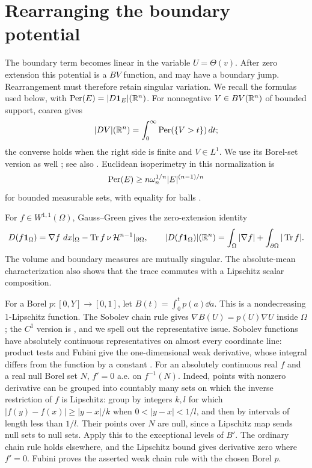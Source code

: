 \section{Rearranging the boundary potential}\label{sec:rearrangement}

The boundary term becomes linear in the variable \(U=\Theta(v)\).
After zero extension this potential is a \(BV\) function, and may have
a boundary jump. Rearrangement must therefore retain singular variation.
We recall the formulas used below, with
\(\operatorname{Per}(E)=|D\mathbf1_E|(\mathbb R^n)\).
For nonnegative \(V\in BV(\mathbb R^n)\) of bounded support, coarea gives
\[
 |DV|(\mathbb R^n)=\int_0^\infty\operatorname{Per}(\{V>t\})\,d t;
\]
the converse holds when the right side is finite and \(V\in L^1\).
We use its Borel-set version as well
\cite[Theorem~1.19]{Gorny}; see also
\cite[Theorem~2.6]{LV}.
Euclidean isoperimetry in this normalization is
\[
 \operatorname{Per}(E)\ge n\omega_n^{1/n}|E|^{(n-1)/n}
\]
for bounded measurable sets, with equality for balls
\cite[Theorem~2.1]{AGNT}.

For \(f\in W^{1,1}(\Omega)\), Gauss--Green gives the zero-extension
identity
\begin{equation}\label{eq:zeroextension}
 D(f\mathbf1_\Omega)=\nabla f\,\,d x|_\Omega-
                     \operatorname{Tr} f\,\nu\,\mathcal H^{n-1}|_{\partial\Omega},
 \qquad
 |D(f\mathbf1_\Omega)|(\mathbb R^n)=\int_\Omega|\nabla f|+
                                          \int_{\partial\Omega}|\operatorname{Tr} f|.
\end{equation}
The volume and boundary measures are mutually singular.
The absolute-mean characterization also shows that the trace commutes
with a Lipschitz scalar composition.

For a Borel \(p:[0,Y]\to[0,1]\), let \(B(t)=\int_0^t p(a)\dd a\).
This is a nondecreasing 1-Lipschitz function. The Sobolev chain rule gives
\(\nabla B(U)=p(U)\nabla U\) inside \(\Omega\); the \(C^1\) version is
\cite[Proposition~3.21(2)]{Hunter}, and we spell out the representative
issue. Sobolev functions have absolutely continuous representatives on
almost every coordinate line: product tests and Fubini give the
one-dimensional weak derivative, whose integral differs from the
function by a constant \cite[Proposition~3.6]{Hunter}.
For an absolutely continuous real \(f\) and a real null Borel set \(N\),
\(f'=0\) a.e. on \(f^{-1}(N)\). Indeed, points with nonzero derivative
can be grouped into countably many sets on which the inverse
restriction of \(f\) is Lipschitz: group by integers \(k,l\) for which
\(|f(y)-f(x)|\ge |y-x|/k\) when \(0<|y-x|<1/l\), and then by intervals
of length less than \(1/l\). Their points over \(N\) are null, since
a Lipschitz map sends null sets to null sets. Apply this to the
exceptional levels of \(B'\). The ordinary chain rule holds elsewhere,
and the Lipschitz bound gives derivative zero where \(f'=0\).
Fubini proves the asserted weak chain rule with the chosen Borel \(p\).

